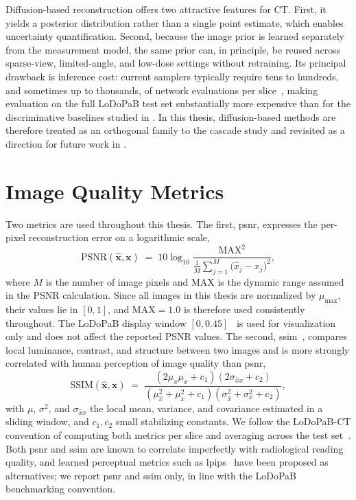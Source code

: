 Diffusion-based reconstruction offers two attractive features for CT. First, it yields a posterior distribution rather than a single point estimate, which enables uncertainty quantification. Second, because the image prior is learned separately from the measurement model, the same prior can, in principle, be reused across sparse-view, limited-angle, and low-dose settings without retraining. Its principal drawback is inference cost: current samplers typically require tens to hundreds, and sometimes up to thousands, of network evaluations per slice~\cite{Ho2020, Yang2024DiffusionSurvey}, making evaluation on the full LoDoPaB test set substantially more expensive than for the discriminative baselines studied in . In this thesis, diffusion-based methods are therefore treated as an orthogonal family to the cascade study and revisited as a direction for future work in .

\section{Image Quality Metrics}
\label{sec:bg_metrics}

Two metrics are used throughout this thesis. The first, \gls{psnr}, expresses the per-pixel reconstruction error on a logarithmic scale,
\begin{equation}
    \mathrm{PSNR}(\hat{\boldsymbol{x}},\boldsymbol{x})
    \;=\; 10 \log_{10}\!\frac{\mathrm{MAX}^{2}}{\frac{1}{M}\sum_{j=1}^{M}\bigl(\hat{x}_{j} - x_{j}\bigr)^{2}},
    \label{eq:psnr}
\end{equation}
where \(M\) is the number of image pixels and \(\mathrm{MAX}\) is the dynamic range assumed in the PSNR calculation. Since all images in this thesis are normalized by \(\mu_{\max}\), their values lie in \([0,1]\), and \(\mathrm{MAX}=1.0\) is therefore used consistently throughout. The LoDoPaB display window \([0, 0.45]\)~\cite{Leuschner2021} is used for visualization only and does not affect the reported PSNR values. The second, \gls{ssim}~\cite{Wang2004}, compares local luminance, contrast, and structure between two images and is more strongly correlated with human perception of image quality than \gls{psnr},
\begin{equation}
    \mathrm{SSIM}(\hat{\boldsymbol{x}},\boldsymbol{x})
    \;=\; \frac{(2\mu_{\hat{x}}\mu_{x} + c_{1})(2\sigma_{\hat{x}x} + c_{2})}
              {(\mu_{\hat{x}}^{2} + \mu_{x}^{2} + c_{1})(\sigma_{\hat{x}}^{2} + \sigma_{x}^{2} + c_{2})},
    \label{eq:ssim}
\end{equation}
with $\mu$, $\sigma^{2}$, and $\sigma_{\hat{x}x}$ the local mean, variance, and covariance estimated in a sliding window, and $c_{1}, c_{2}$ small stabilizing constants.
We follow the LoDoPaB-CT convention of computing both metrics per slice and averaging across the test set~\cite{Leuschner2021, Kiss2024}.  Both \gls{psnr} and \gls{ssim}
are known to correlate imperfectly with radiological reading quality, and learned perceptual metrics such as \gls{lpips}~\cite{Zhang2018LPIPS} have been proposed as alternatives; we report \gls{psnr} and \gls{ssim} only, in line with the LoDoPaB benchmarking convention.

